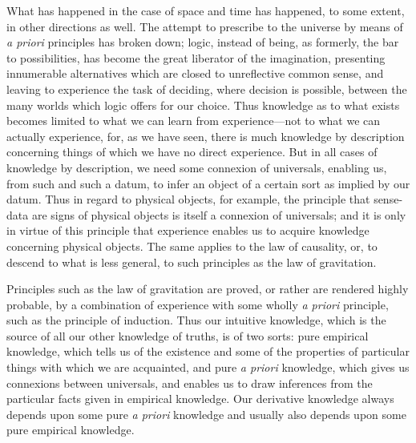 \documentclass[oneside,letterpaper,12pt]{book}
\begin{document}
What has happened in the case of space and time has happened, to some
extent, in other directions as well. The attempt to prescribe to the
universe by means of \emph{a priori} principles has broken down; logic,
instead of being, as formerly, the bar to possibilities, has become the
great liberator of the imagination, presenting innumerable alternatives
which are closed to unreflective common sense, and leaving to experience
the task of deciding, where decision is possible, between the many
worlds which logic offers for our choice. \label{choice} Thus knowledge as to what
exists becomes limited to what we can learn from experience---not to
what we can actually experience, for, as we have seen, there is much
knowledge by description concerning things of which we have no direct
experience. But in all cases of knowledge by description, we need some
connexion of universals, enabling us, from such and such a datum, to
infer an object of a certain sort as implied by our datum. Thus in
regard to physical objects, for example, the principle that sense-data
are signs of physical objects is itself a connexion of universals; and
it is only in virtue of this principle that experience enables us to
acquire knowledge concerning physical objects. The same applies to the
law of causality, or, to descend to what is less general, to such
principles as the law of gravitation.

Principles such as the law of gravitation are proved, or rather are
rendered highly probable, by a combination of experience with some
wholly \emph{a priori} principle, such as the principle of induction.
Thus our intuitive knowledge, which is the source of all our other
knowledge of truths, is of two sorts: pure empirical knowledge, which
tells us of the existence and some of the properties of particular
things with which we are acquainted, and pure \emph{a priori} knowledge,
which gives us connexions between universals, and enables us to draw
inferences from the particular facts given in empirical knowledge. Our
derivative knowledge always depends upon some pure \emph{a priori}
knowledge and usually also depends upon some pure empirical knowledge.
\end{document}
